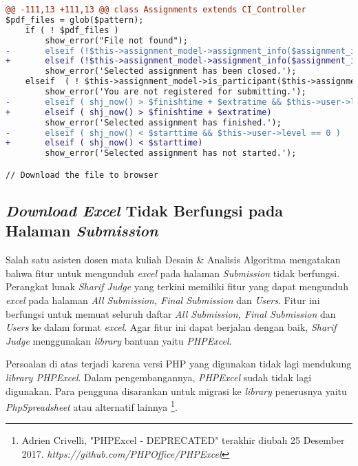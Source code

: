 \begin{lstlisting}[language=diff, caption=Perubahan kode program pada \textit{Assignments.php}, label=lstt:7, basicstyle=\ttfamily, frame=single,
columns=fullflexible, keepspaces=true, breaklines=true]
@@ -111,13 +111,13 @@ class Assignments extends CI_Controller
$pdf_files = glob($pattern);
	if ( ! $pdf_files )
		show_error("File not found");
-   	elseif (!$this->assignment_model->assignment_info($assignment_id)['open'] && $this->user->level == 0 )
+   	elseif (!$this->assignment_model->assignment_info($assignment_id)['open'])
		show_error('Selected assignment has been closed.');
	elseif  ( ! $this->assignment_model->is_participant($this->assignment_model->assignment_info($assignment_id)['participants'],$this->user->username) )
		show_error('You are not registered for submitting.');
-   	elseif ( shj_now() > $finishtime + $extratime && $this->user->level == 0 )
+   	elseif ( shj_now() > $finishtime + $extratime)
		show_error('Selected assignment has finished.');
-   	elseif ( shj_now() < $starttime && $this->user->level == 0 )
+   	elseif ( shj_now() < $starttime)
		show_error('Selected assignment has not started.');

// Download the file to browser
\end{lstlisting}

	\subsection{\textit{Download Excel} Tidak Berfungsi pada Halaman \textit{Submission}}
	Salah satu asisten dosen mata kuliah Desain \& Analisis Algoritma mengatakan bahwa fitur untuk mengunduh \textit{excel} pada halaman \textit{Submission} tidak berfungsi. Perangkat lunak \textit{Sharif Judge} yang terkini memiliki fitur yang dapat mengunduh \textit{excel} pada halaman \textit{All Submission, Final Submission} dan \textit{Users}. Fitur ini berfungsi untuk memuat seluruh daftar \textit{All Submission, Final Submission} dan \textit{Users} ke dalam format \textit{excel}. Agar fitur ini dapat berjalan dengan baik, \textit{Sharif Judge} menggunakan \textit{library} bantuan yaitu \textit{PHPExcel}.
	
	Persoalan di atas terjadi karena versi PHP yang digunakan tidak lagi mendukung \textit{library PHPExcel}. Dalam pengembangannya, \textit{PHPExcel} sudah tidak lagi digunakan. Para pengguna disarankan untuk migrasi ke \textit{library} penerusnya yaitu \textit{PhpSpreadsheet} atau alternatif lainnya \footnote{Adrien Crivelli, "PHPExcel - DEPRECATED" terakhir diubah 25 Desember 2017. \textit{https://github.com/PHPOffice/PHPExcel}}.
	
